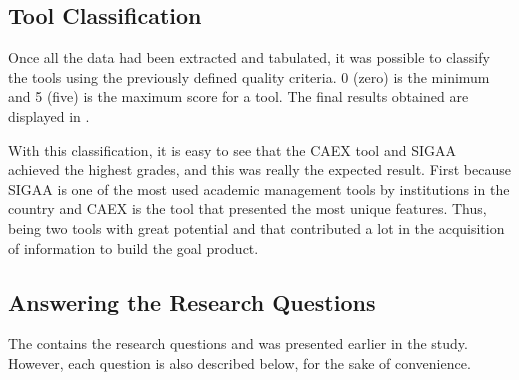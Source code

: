 \subsection{Tool Classification}\label{sec:gl-tool-classification}

Once all the data had been extracted and tabulated, it was possible to classify the tools using the previously defined quality criteria. 0 (zero) is the minimum and 5 (five) is the maximum score for a tool. The final results obtained are displayed in .



With this classification, it is easy to see that the \ac{CAEX} tool and \ac{SIGAA} achieved the highest grades, and this was really the expected result. First because \ac{SIGAA} is one of the most used academic management tools by institutions in the country and \ac{CAEX} is the tool that presented the most unique features. Thus, being two tools with great potential and that contributed a lot in the acquisition of information to build the goal product.

\subsection{Answering the Research Questions}\label{sec:gl-answer-research-questions}

The  contains the research questions and was presented earlier in the study. However, each question is also described below, for the sake of convenience.

